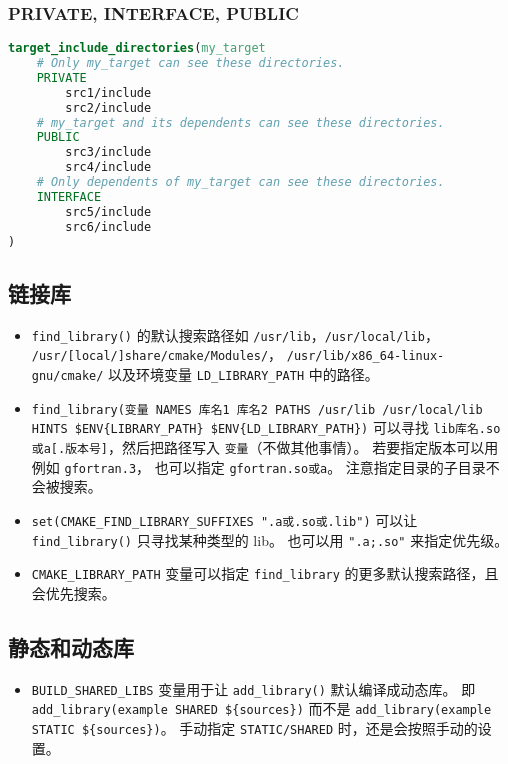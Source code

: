 \subsubsection{PRIVATE, INTERFACE, PUBLIC}
\begin{lstlisting}[language=cmake]
target_include_directories(my_target
    # Only my_target can see these directories.
    PRIVATE
        src1/include
        src2/include
    # my_target and its dependents can see these directories.
    PUBLIC
        src3/include
        src4/include
    # Only dependents of my_target can see these directories.
    INTERFACE
        src5/include
        src6/include
)
\end{lstlisting}

\subsection{链接库}
\begin{itemize}
\item \verb`find_library()` 的默认搜索路径如 \verb`/usr/lib`，\verb`/usr/local/lib`， \verb`/usr/[local/]share/cmake/Modules/`， \verb`/usr/lib/x86_64-linux-gnu/cmake/` 以及环境变量 \verb`LD_LIBRARY_PATH` 中的路径。
\item \verb`find_library(变量 NAMES 库名1 库名2 PATHS /usr/lib /usr/local/lib HINTS $ENV{LIBRARY_PATH} $ENV{LD_LIBRARY_PATH})` 可以寻找 \verb`lib库名.so或a[.版本号]`，然后把路径写入 \verb`变量`（不做其他事情）。 若要指定版本可以用例如 \verb`gfortran.3`， 也可以指定 \verb`gfortran.so或a`。 注意指定目录的子目录不会被搜索。
\item \verb`set(CMAKE_FIND_LIBRARY_SUFFIXES ".a或.so或.lib")` 可以让 \verb`find_library()` 只寻找某种类型的 lib。 也可以用 \verb`".a;.so"` 来指定优先级。
\item \verb`CMAKE_LIBRARY_PATH` 变量可以指定 \verb`find_library` 的更多默认搜索路径，且会优先搜索。
\end{itemize}

\subsection{静态和动态库}
\begin{itemize}
\item \verb`BUILD_SHARED_LIBS` 变量用于让 \verb`add_library()` 默认编译成动态库。 即 \verb`add_library(example SHARED ${sources})` 而不是 \verb`add_library(example STATIC ${sources})`。 手动指定 \verb`STATIC/SHARED` 时，还是会按照手动的设置。
\end{itemize}


